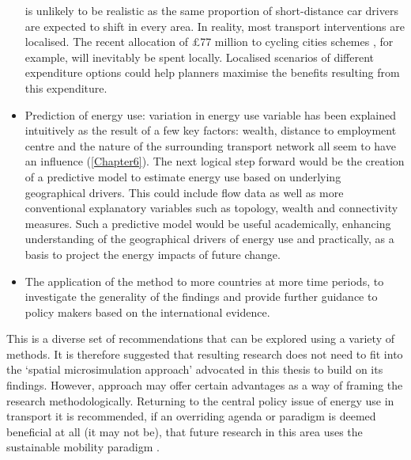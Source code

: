 \begin{itemize}
is unlikely to be realistic as the same proportion of short-distance car
drivers are expected to shift in every area. In reality, most transport
interventions are localised. The recent allocation of \pounds 77 million to
cycling cities schemes \citep{BBc2013-cycling}, for example, will inevitably be
spent locally. Localised scenarios of different expenditure options could help
planners maximise the benefits resulting from this expenditure.
\item Prediction of energy use: variation in energy use variable has been
explained intuitively as the result of a few key factors: wealth, distance to
employment centre and the nature of the surrounding transport network all seem
to have an influence (\cref{Chapter6}). The next logical step forward would
be the creation of a predictive model to estimate energy use based on
underlying geographical drivers. This could include flow data
\citep{Simini2012} as well as more conventional explanatory variables such as
topology, wealth and connectivity measures. Such a predictive model would be
useful academically, enhancing understanding of the geographical drivers of
energy use \citep{Steemers2003} and practically, as a basis to project the
energy impacts of future change.
\item The application of the method to more countries at more time periods, to
investigate the generality of the findings and provide further guidance to
policy makers based on the international evidence.
\end{itemize}
This is a diverse set of recommendations that can be explored using a variety
of methods. It is therefore suggested that resulting research does not 
need to fit into the `spatial microsimulation approach' advocated
in this thesis to build on its findings. However, approach
may offer certain advantages as a way of framing the research methodologically.
Returning to the central policy issue of energy use in transport
it is recommended, if an overriding agenda or
paradigm is deemed beneficial at all (it may not be), that future research
in this area uses the sustainable mobility paradigm \citet{Banister2008}.

